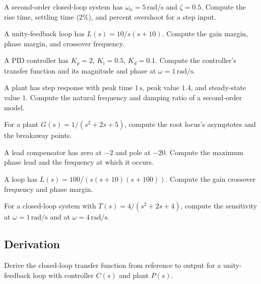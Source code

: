 \begin{exercise}
A second-order closed-loop system has $\omega_n = 5\,\text{rad/s}$ and $\zeta = 0.5$. Compute the rise time, settling time ($2\%$), and percent overshoot for a step input.
\end{exercise}

\begin{exercise}
A unity-feedback loop has $L(s) = 10/s(s+10)$. Compute the gain margin, phase margin, and crossover frequency.
\end{exercise}

\begin{exercise}
A PID controller has $K_p = 2$, $K_i = 0.5$, $K_d = 0.1$. Compute the controller's transfer function and its magnitude and phase at $\omega = 1\,\text{rad/s}$.
\end{exercise}

\begin{exercise}
A plant has step response with peak time $1\,\text{s}$, peak value $1.4$, and steady-state value $1$. Compute the natural frequency and damping ratio of a second-order model.
\end{exercise}

\begin{exercise}
For a plant $G(s) = 1/(s^2 + 2s + 5)$, compute the root locus's asymptotes and the breakaway points.
\end{exercise}

\begin{exercise}
A lead compensator has zero at $-2$ and pole at $-20$. Compute the maximum phase lead and the frequency at which it occurs.
\end{exercise}

\begin{exercise}
A loop has $L(s) = 100/(s(s+10)(s+100))$. Compute the gain crossover frequency and phase margin.
\end{exercise}

\begin{exercise}
For a closed-loop system with $T(s) = 4/(s^2 + 2s + 4)$, compute the sensitivity at $\omega = 1\,\text{rad/s}$ and at $\omega = 4\,\text{rad/s}$.
\end{exercise}

\subsection*{Derivation}

\begin{exercise}
Derive the closed-loop transfer function from reference to output for a unity-feedback loop with controller $C(s)$ and plant $P(s)$.
\end{exercise}


